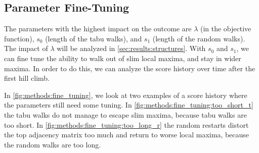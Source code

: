 \documentclass[sigconf, fleqn, prologue, dvipsnames]{acmart}
\begin{document}
\subsection{Parameter Fine-Tuning}
The parameters with the highest impact on the outcome are $\lambda$ (in the objective function), $s_0$ (length of the tabu walks), and $s_1$ (length of the random walks).
The impact of $\lambda$ will be analyzed in \autoref{sec:results:structures}.
With $s_0$ and $s_1$, we can fine tune the ability to walk out of slim local maxima, and stay in wider maxima.
In order to do this, we can analyze the score history over time after the first hill climb.

In \autoref{fig:methods:fine_tuning}, we look at two examples of a score history where the parameters still need some tuning.
In \autoref{fig:methods:fine_tuning:too_short_t} the tabu walks do not manage to escape slim maxima, because tabu walks are too short.
In \autoref{fig:methods:fine_tuning:too_long_r} the random restarts distort the top adjacency matrix too much and return to worse local maxima, because the random walks are too long.
\end{document}
